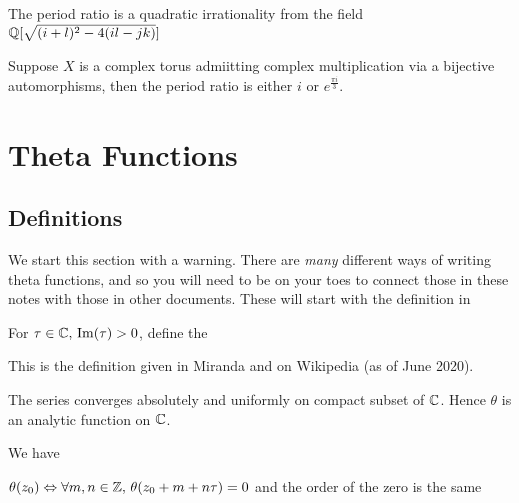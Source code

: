 \documentclass{article}
\begin{document}
\begin{lemma}
	The period ratio is a quadratic irrationality from the field $\mathbb{Q}[\sqrt{(i+l)^2 - 4(il-jk)}]$
\end{lemma}

\begin{prop}
	Suppose $X$ is a complex torus admiitting complex multiplication via a bijective automorphisms, then the period ratio is either $i$ or $e^{\frac{\pi i}{3}}$. 
\end{prop}


\section{Theta Functions}
\subsection{Definitions}
We start this section with a warning. There are \emph{many} different ways of writing theta functions, and so you will need to be on your toes to connect those in these notes with those in other documents. These will start with the definition in 

\begin{definition}
	For $\tau \in \mathbb{C}, \, \operatorname{Im}(\tau)>0$, define the  
\end{definition}

\begin{remark}
	This is the definition given in Miranda and on Wikipedia (as of June 2020). 
\end{remark}

\begin{prop}
	The series converges absolutely and uniformly on compact subset of $\mathbb{C}$. Hence $\theta$ is an analytic function on $\mathbb{C}$. 
\end{prop}

\begin{prop}
	We have 
\end{prop}

\begin{corollary}
	$\theta(z_0) \Leftrightarrow \forall m,n \in \mathbb{Z}, \, \theta(z_0 + m + n\tau)=0$ and the order of the zero is the same
\end{corollary}
\end{document}
